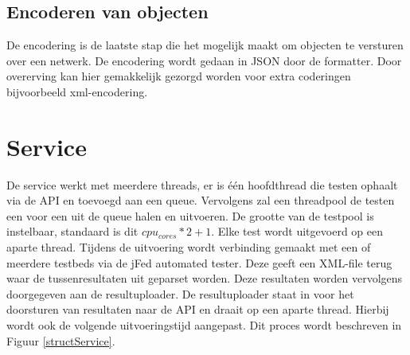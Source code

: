 \subsection{Encoderen van objecten}
\npar
De encodering is de laatste stap die het mogelijk maakt om objecten te versturen over een netwerk. De encodering wordt gedaan in JSON door de formatter. Door overerving kan hier gemakkelijk gezorgd worden voor extra coderingen bijvoorbeeld xml-encodering.
\section{Service}
\npar
De service werkt met meerdere threads, er is \'e\'en hoofdthread die testen ophaalt via de API en toevoegd aan een queue. Vervolgens zal een threadpool de testen een voor een uit de queue halen en uitvoeren. De grootte van de testpool is instelbaar, standaard is dit $cpu_{cores} * 2 + 1$.
\npar
Elke test wordt uitgevoerd op een aparte thread. Tijdens de uitvoering wordt verbinding gemaakt met een of meerdere testbeds via de jFed automated tester. Deze geeft een XML-file terug waar de tussenresultaten uit geparset worden. Deze resultaten worden vervolgens doorgegeven aan de resultuploader.
\npar
De resultuploader staat in voor het doorsturen van resultaten naar de API en draait op een aparte thread. Hierbij wordt ook de volgende uitvoeringstijd aangepast. Dit proces wordt beschreven in Figuur \ref{structService}.
\clearpage
